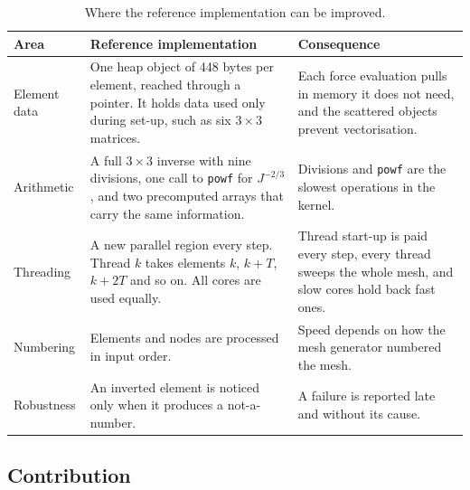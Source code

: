 \documentclass[11pt,a4paper]{article}
\newcommand{\code}[1]{\texttt{#1}}
\newcommand{\Jm}{J^{-2/3}}
\begin{document}
\begin{table}[ht]
\centering
\small
\caption{Where the reference implementation can be improved.}
\label{tab:areas}
\begin{tabularx}{\linewidth}{@{}l Y Y@{}}
\toprule
Area & Reference implementation & Consequence \\
\midrule
Element data & One heap object of 448 bytes per element, reached through a pointer. It holds data used only during set-up, such as six $3\times3$ matrices. & Each force evaluation pulls in memory it does not need, and the scattered objects prevent vectorisation. \\
\addlinespace
Arithmetic & A full $3\times3$ inverse with nine divisions, one call to \code{powf} for $\Jm$, and two precomputed arrays that carry the same information. & Divisions and \code{powf} are the slowest operations in the kernel. \\
\addlinespace
Threading & A new parallel region every step. Thread $k$ takes elements $k$, $k+T$, $k+2T$ and so on. All cores are used equally. & Thread start-up is paid every step, every thread sweeps the whole mesh, and slow cores hold back fast ones. \\
\addlinespace
Numbering & Elements and nodes are processed in input order. & Speed depends on how the mesh generator numbered the mesh. \\
\addlinespace
Robustness & An inverted element is noticed only when it produces a not-a-number. & A failure is reported late and without its cause. \\
\bottomrule
\end{tabularx}
\end{table}

\subsection{Contribution}
\end{document}
